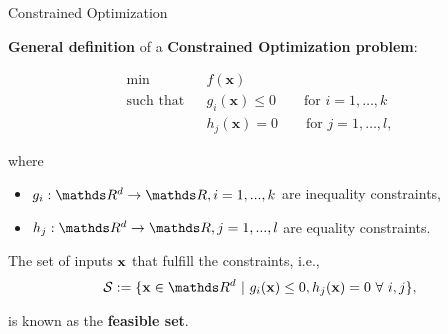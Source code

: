\documentclass[11pt,compress,t,notes=noshow, xcolor=table]{beamer}
\begin{document}
%
%
%
%
%
%
%

\begin{vbframe}{Constrained Optimization}

\textbf{General definition} of a \textbf{Constrained Optimization problem}:

\begin{eqnarray*}
\min && f(\mathbf{x})  \\
\text{such that} && g_i(\mathbf{x}) \le 0 \qquad \text{for } i=1,\ldots,k  \\
 && h_j(\mathbf{x}) = 0 \qquad \text{for } j=1,\ldots,l,
\end{eqnarray*}

\vspace*{-0.5cm}

where

\begin{itemize}
\item $g_i: \R^d \to \R, i = 1, ..., k$ are inequality constraints,
\item $h_j: \R^d \to \R, j = 1, ..., l$ are equality constraints.
\end{itemize}

\lz 

The set of inputs $\mathbf{x}$ that fulfill the constraints, i.e.,
\begin{equation*}
    \mathcal{S} := \{\xv \in \R^d ~|~ g_i(\xv) \le 0, h_j(\xv) = 0 ~\forall~ i, j\},
\end{equation*} 

is known as the \textbf{feasible set}.

\end{vbframe}
\end{document}
